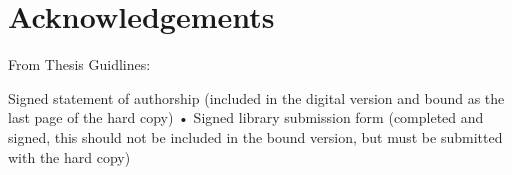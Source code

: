\section*{Acknowledgements}

From Thesis Guidlines: 

Signed statement of authorship (included in the digital version and bound as the last page
of the hard copy)
• Signed library submission form (completed and signed, this should not be included in the
bound version, but must be submitted with the hard copy)

